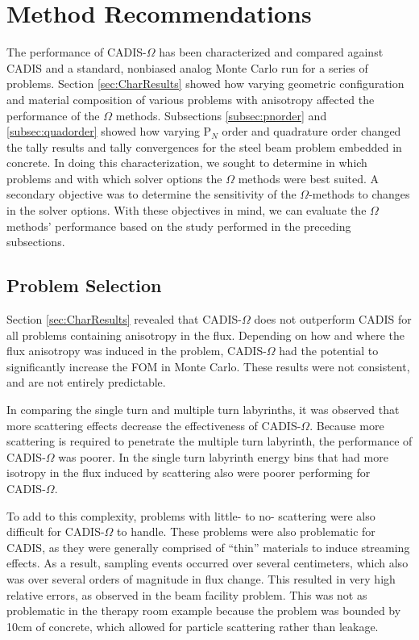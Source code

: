 \section{Method Recommendations}
\label{sec:method_recs}

The performance of CADIS-$\Omega$ has been characterized and compared against
CADIS and a standard, nonbiased analog Monte Carlo run for a series of problems.
Section \ref{sec:CharResults} showed how varying geometric configuration and
material composition of various problems with anisotropy affected the
performance of the $\Omega$ methods.
Subsections \ref{subsec:pnorder} and \ref{subsec:quadorder} showed how varying
P$_N$ order and quadrature order changed the tally results and tally
convergences for the steel beam problem embedded in concrete. In doing this
characterization, we sought to determine in which problems and with which solver
options the $\Omega$ methods were best suited. A secondary objective was to
determine the sensitivity of the $\Omega$-methods to changes in the solver
options. With these objectives in mind, we can evaluate the $\Omega$ methods'
performance based on the study performed in the preceding subsections.

\subsection{Problem Selection}
\label{sec:materials_recs}

Section \ref{sec:CharResults} revealed that CADIS-$\Omega$ does not outperform
CADIS for all problems containing anisotropy in the flux. Depending on how and
where the flux
anisotropy was induced in the problem, CADIS-$\Omega$ had the potential to
significantly increase the FOM in Monte Carlo. These results were not
consistent, and are not entirely predictable.

In comparing the single turn and multiple turn labyrinths, it was observed that
more scattering effects decrease the effectiveness of CADIS-$\Omega$. Because
more scattering is required to penetrate the multiple turn labyrinth,
the performance of CADIS-$\Omega$ was poorer. In the single turn labyrinth
energy bins that had more isotropy in the flux induced by scattering also were
poorer performing for CADIS-$\Omega$.

To add to this complexity, problems with little- to no- scattering were also
difficult for CADIS-$\Omega$ to handle. These problems were also problematic for
CADIS, as they were generally comprised of ``thin'' materials to induce
streaming effects. As a result, sampling events occurred over several
centimeters, which also was over several orders of magnitude in flux change.
This resulted in very high relative errors, as observed in the beam facility
problem. This was not as problematic in the therapy room example because the
problem was bounded by 10cm of concrete, which allowed for particle scattering
rather than leakage.

